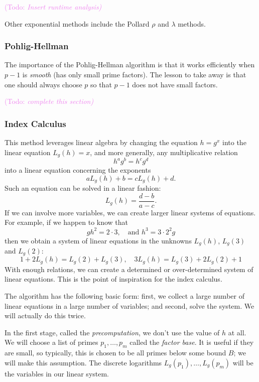 \documentclass{article}
\theoremstyle{plain}
\theoremstyle{definition}
\theoremstyle{remark}
\numberwithin{theorem}{section}
\newcommand{\KS}[1]{\textcolor{violet}{{\sf (Todo:} {\sl{#1})}}}
\newcommand{\KS}[1]{}
\newcommand{\bespokedemo}[1]{\href{bespoke:#1}{\textsf{[\,interactive: #1\,]}}}
\newif\ifweb \webfalse
\DeclareRobustCommand{\webonly}[1]{\ifweb#1\fi}
\begin{document}
\webonly{\bespokedemo{baby-giant-clock}}

\KS{Insert runtime analysis}

Other exponential methods include the Pollard $\rho$ and $\lambda$ methods.

\subsubsection{Pohlig-Hellman}

The importance of the Pohlig-Hellman algorithm is that it works efficiently when $p-1$ is \emph{smooth} (has only small prime factors).  The lesson to take away is that one should always choose $p$ so that $p-1$ does not have small factors.

\KS{complete this section}

\subsubsection{Index Calculus}

This method leverages linear algebra by changing the equation $h = g^x$ into the linear equation $L_g(h) = x$, and more generally, any multiplicative relation
\[
	h^ag^b = h^c g^d
\]
into a linear equation concerning the exponents
\[
	a L_g(h) + b = c L_g(h) + d.
\]
Such an equation can be solved in a linear fashion:
\[
	L_g(h) = \frac{d-b}{a-c}.
\]
If we can involve more variables, we can create larger linear systems of equations.   For example, if we happen to know that
\[
	gh^2 = 2 \cdot 3, \quad \text{and } h^3 = 3 \cdot 2^2 g
\]
then we obtain a system of linear equations in the unknowns $L_g(h)$, $L_g(3)$ and $L_g(2)$:
\[
	1 + 2 L_g(h) = L_g(2) + L_g(3), \quad 3 L_g(h) = L_g(3) + 2 L_g(2) + 1
\]
With enough relations, we can create a determined or over-determined system of linear equations.
This is the point of inspiration for the index calculus.

The algorithm has the following basic form:  first, we collect a large number of linear equations in a large number of variables; and second, solve the system.  We will actually do this twice.

In the first stage, called the \emph{precomputation}, we don't use the value of $h$ at all.  We will choose a list of primes $p_1, \ldots, p_m$ called the \emph{factor base}.  It is useful if they are small, so typically, this is chosen to be all primes below some bound $B$; we will make this assumption.  The discrete logarithms $L_g(p_1), \ldots, L_g(p_m)$ will be the variables in our linear system.
\end{document}
